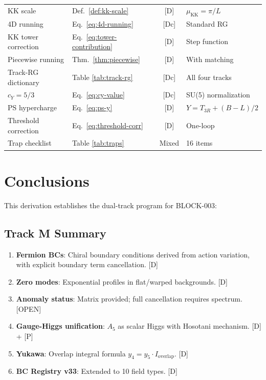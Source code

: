 \documentclass[11pt,a4paper]{article}
\begin{document}
\begin{longtable}{llcl}
KK scale & Def.\ \ref{def:kk-scale} & [D] & $\mu_{\text{KK}} = \pi/L$ \\
4D running & Eq.\ \eqref{eq:4d-running} & [Dc] & Standard RG \\
KK tower correction & Eq.\ \eqref{eq:tower-contribution} & [D] & Step function \\
Piecewise running & Thm.\ \ref{thm:piecewise} & [D] & With matching \\
Track-RG dictionary & Table \ref{tab:track-rg} & [Dc] & All four tracks \\
$c_Y = 5/3$ & Eq.\ \eqref{eq:cy-value} & [Dc] & SU(5) normalization \\
PS hypercharge & Eq.\ \eqref{eq:ps-y} & [D] & $Y = T_{3R} + (B-L)/2$ \\
Threshold correction & Eq.\ \eqref{eq:threshold-corr} & [D] & One-loop \\
Trap checklist & Table \ref{tab:traps} & Mixed & 16 items \\
\end{longtable}

\section{Conclusions}
\label{sec:conclusions}

This derivation establishes the dual-track program for BLOCK-003:

\subsection{Track M Summary}

\begin{enumerate}
\item \textbf{Fermion BCs}: Chiral boundary conditions derived from action variation,
      with explicit boundary term cancellation. [D]
\item \textbf{Zero modes}: Exponential profiles in flat/warped backgrounds. [D]
\item \textbf{Anomaly status}: Matrix provided; full cancellation requires spectrum. [OPEN]
\item \textbf{Gauge-Higgs unification}: $A_5$ as scalar Higgs with Hosotani mechanism. [D] + [P]
\item \textbf{Yukawa}: Overlap integral formula $y_4 = y_5 \cdot I_{\text{overlap}}$. [D]
\item \textbf{BC Registry v33}: Extended to 10 field types. [D]
\end{enumerate}
\end{document}
